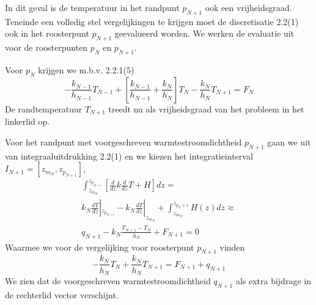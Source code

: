 
In dit geval is de temperatuur in het randpunt $p_{N+1}$ ook een
vrijheidsgraad.
Teneinde een volledig stel vergelijkingen te krijgen moet de 
discretisatie 2.2(1) ook in het roosterpunt $p_{N+1}$ geevalueerd
worden.
We werken de evaluatie uit voor de roosterpunten $p_{N}$ en $p_{N+1}$.

Voor $p_N$ krijgen we m.b.v. 2.2.1(5)
\begin{equation}
- \frac {k_{N-1}} {h_{N-1}} T_{N-1}
+ \left [
          \frac {k_{N-1}} {h_{N-1}}
          +
          \frac {k_{N  }} {h_{N  }}
  \right ]
T_{N}
- \frac {k_N} {h_N} T_{N+1}
= F_N
\end{equation}
De randtemperatuur $T_{N+1}$ treedt nu als vrijheidsgraad van het
probleem in het linkerlid op.

Voor het randpunt met voorgeschreven warmtestroomdichtheid $p_{N+1}$
gaan we uit van integraaluitdrukking 2.2(1) en we kiezen het
integratieinterval $I_{N+1} = [z_{m_N} , z_{p_{N+1}} ]$,
\begin{eqnarray}
\int_{z_{m_N}} ^{z_{p_{N+1}}}
\left [ \frac{d}{dz} k \frac{d}{dz} T + H \right ] dz
= \nonumber \\
k_N   \frac {dT}{dz} |_{z_{p_{N+1}}} -
k_N \frac {dT}{dz} |_{z_{m_{N  }}} +
\int_{z_{m_N}} ^{z_{{p_N+1}}} H(z) dz
\approx \nonumber \\
q_{N+1} - 
k_N \frac{ T_{N+1} - T_{N}} {h_N} + F_{N+1}
= 0
\end{eqnarray}
Waarmee we voor de vergelijking voor roosterpunt $p_{N+1}$ vinden
\begin{equation}
- \frac{k_N}{h_N} T_{N  }
+ \frac{k_N}{h_N} T_{N+1}
=
F_{N+1} +
q_{N+1}
\end{equation}
We zien dat de voorgeschreven warmtestroomdichtheid $q_{N+1}$
als extra bijdrage in de rechterlid vector verschijnt.




